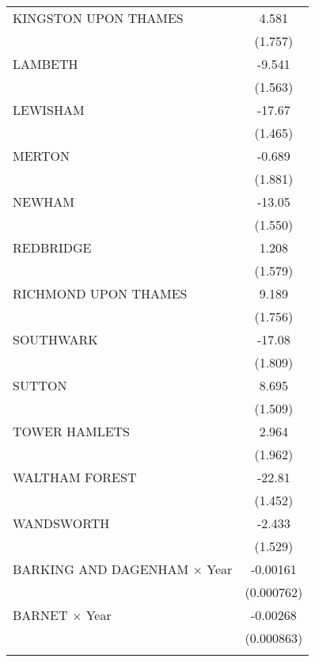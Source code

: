 {\begin{longtable}{l*{1}{c}}
\addlinespace
KINGSTON UPON THAMES&       4.581\sym{**} \\
                    &     (1.757)         \\
\addlinespace
LAMBETH             &      -9.541\sym{***}\\
                    &     (1.563)         \\
\addlinespace
LEWISHAM            &      -17.67\sym{***}\\
                    &     (1.465)         \\
\addlinespace
MERTON              &      -0.689         \\
                    &     (1.881)         \\
\addlinespace
NEWHAM              &      -13.05\sym{***}\\
                    &     (1.550)         \\
\addlinespace
REDBRIDGE           &       1.208         \\
                    &     (1.579)         \\
\addlinespace
RICHMOND UPON THAMES&       9.189\sym{***}\\
                    &     (1.756)         \\
\addlinespace
SOUTHWARK           &      -17.08\sym{***}\\
                    &     (1.809)         \\
\addlinespace
SUTTON              &       8.695\sym{***}\\
                    &     (1.509)         \\
\addlinespace
TOWER HAMLETS       &       2.964         \\
                    &     (1.962)         \\
\addlinespace
WALTHAM FOREST      &      -22.81\sym{***}\\
                    &     (1.452)         \\
\addlinespace
WANDSWORTH          &      -2.433         \\
                    &     (1.529)         \\
\addlinespace
BARKING AND DAGENHAM $\times$ Year&    -0.00161\sym{*}  \\
                    &  (0.000762)         \\
\addlinespace
BARNET $\times$ Year&    -0.00268\sym{**} \\
                    &  (0.000863)         \\
\addlinespace

\end{longtable}}
